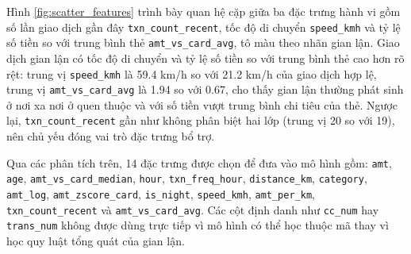 Hình \ref{fig:scatter_features} trình bày quan hệ cặp giữa ba đặc trưng hành vi gồm số lần giao dịch gần đây \texttt{txn\_count\_recent}, tốc độ di chuyển \texttt{speed\_kmh} và tỷ lệ số tiền so với trung bình thẻ \texttt{amt\_vs\_card\_avg}, tô màu theo nhãn gian lận. Giao dịch gian lận có tốc độ di chuyển và tỷ lệ số tiền so với trung bình thẻ cao hơn rõ rệt: trung vị \texttt{speed\_kmh} là 59{.}4 km/h so với 21{.}2 km/h của giao dịch hợp lệ, trung vị \texttt{amt\_vs\_card\_avg} là 1{.}94 so với 0{.}67, cho thấy gian lận thường phát sinh ở nơi xa nơi ở quen thuộc và với số tiền vượt trung bình chi tiêu của thẻ. Ngược lại, \texttt{txn\_count\_recent} gần như không phân biệt hai lớp (trung vị 20 so với 19), nên chủ yếu đóng vai trò đặc trưng bổ trợ.



Qua các phân tích trên, 14 đặc trưng được chọn để đưa vào mô hình gồm: \texttt{amt}, \texttt{age}, \texttt{amt\_vs\_card\_median}, \texttt{hour}, \texttt{txn\_freq\_hour}, \texttt{distance\_km}, \texttt{category}, \texttt{amt\_log}, \texttt{amt\_zscore\_card}, \texttt{is\_night}, \texttt{speed\_kmh}, \texttt{amt\_per\_km}, \texttt{txn\_count\_recent} và \texttt{amt\_vs\_card\_avg}. Các cột định danh như \texttt{cc\_num} hay \texttt{trans\_num} không được dùng trực tiếp vì mô hình có thể học thuộc mã thay vì học quy luật tổng quát của gian lận.